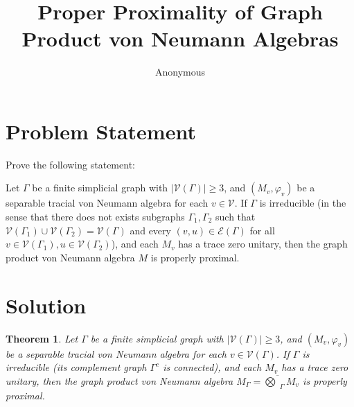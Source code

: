 \documentclass[12pt]{article}
\title{Proper Proximality of Graph Product von Neumann Algebras}
\author{Anonymous}
\date{}
\newtheorem{theorem}{Theorem}
\newcommand{\VV}{\mathcal{V}}
\newcommand{\EE}{\mathcal{E}}
\newcommand{\GG}{\Gamma}
\begin{document}
\maketitle

\section*{Problem Statement}

Prove the following statement:

Let $\Gamma$ be a finite simplicial graph with $|\VV(\GG)|\geq 3$, and $(M_v,\varphi_v)$ be a separable tracial von Neumann algebra for each $v\in \VV$. If $\Gamma$ is irreducible (in the sense that there does not exists subgraphs $\GG_1,\GG_2$ such that $ \VV(\GG_1)\cup \VV(\GG_2)=\VV(\GG) $ and every $(v,u)\in \EE(\GG) $ for all $v\in\VV(\GG_1),u\in \VV(\GG_2)$), and each $M_v$ has a trace zero unitary, then the graph product von Neumann algebra $M$ is properly proximal.

\section*{Solution}

\begin{theorem}
Let $\Gamma$ be a finite simplicial graph with $|\VV(\Gamma)|\geq 3$, and $(M_v,\varphi_v)$ be a separable tracial von Neumann algebra for each $v\in \VV(\Gamma)$. If $\Gamma$ is irreducible (its complement graph $\Gamma^c$ is connected), and each $M_v$ has a trace zero unitary, then the graph product von Neumann algebra $M_\Gamma = \overline{\bigotimes}_\Gamma M_v$ is properly proximal.
\end{theorem}
\end{document}
